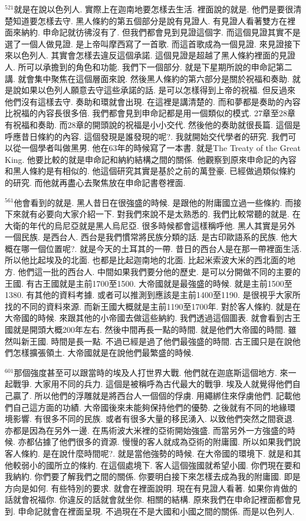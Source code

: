 \documentclass{book}
\begin{document}
$^{521}$就是在說以色列人.
實際上在迦南地要怎樣去生活.
裡面說的就是.
他們是要很清楚知道要怎樣去守.
黑人條約的第五個部分是說有見證人.
有見證人看著雙方在裡面來納約.
申命記就彷彿沒有了.
但我們都會見到見證這個字.
而這個見證其實不是選了一個人做見證.
是上帝叫摩西寫了一首歌.
而這首歌成為一個見證.
來見證接下來以色列人.
其實會怎樣去違反這個承諾.
這個見證是超越了黑人條約裡面的見證人.
所可以承擔到的角色和功能.
我們下一個部分.
就是下星期所說的申命記第二講.
就會集中聚焦在這個層面來說.
然後黑人條約的第六部分是關於祝福和奏助.
就是說如果以色列人願意去守這些承諾的話.
是可以怎樣得到上帝的祝福.
但反過來他們沒有這樣去守.
奏助和環就會出現.
在這裡是講清楚的.
而和夢都是奏助的內容比祝福的內容長很多倍.
我們都會見到申命記都是用一個類似的模式.
27章至28章有祝福和奏助.
而28章的開頭說的祝福是小小交代.
然後他的奏助就很長篇.
這個是呼應昔日條約的內容.
這個發現是誰發現的呢?.
我就開始交代學者的研究.
我們可以從一個學者叫做黑男.
他在63年的時候寫了一本書.
就是The Treaty of the Great King.
他要比較的就是申命記和納約結構之間的關係.
他觀察到原來申命記的內容和黑人條約是有相似的.
他這個研究其實是基於之前的萬登豪.
已經做過類似條約的研究.
而他就再盡心去聚焦放在申命記書卷裡面.

$^{561}$他會看到的就是.
黑人昔日在很強盛的時候.
是跟他的附庸國立過一些條約.
而接下來就有必要向大家介紹一下.
對我們來說不是太熟悉的.
我們比較常聽的就是.
在大衛的年代的烏尼亞就是黑人烏尼亞.
很多時候都會這樣稱呼他.
黑人其實是另外一個民族.
是西台人.
西台是我們慣常將民族分類的話.
是古印歐語系的民族.
他大概在哪一個位置呢?.
就是今天的土耳其的一帶.
昔日的西台人是在那一帶裡面生活.
所以他比起埃及的北面.
也都是比起迦南地的北面.
比起米索波大米的西北面的地方.
他們這一批的西台人.
中間如果我們要分他的歷史.
是可以分開做不同的主要的王國.
有古王國就是主前1700至1500.
大帝國就是最強盛的時候.
就是主前1500至1380.
有其他的資料考據.
或者可以推測到應該是主前1400至1190.
是很視乎大家所找的不同的資料來源.
而新王國大概就是主前1190至1700年.
對於客人條約.
就是在大帝國的時候.
來跟其他的小帝國去做這些納約.
我們透過這個圖表.
就會看到古王國就是開頭大概200年左右.
然後中間再長一點的時間.
就是他們大帝國的時間.
雖然叫新王國.
時間是長一點.
不過已經是過了他們最強盛的時間.
古王國只是在說他們怎樣擴張領土.
大帝國就是在說他們最繁盛的時候.

$^{601}$那個強度甚至可以跟當時的埃及人打世界大戰.
他們就在迦底斯這個地方.
來一起戰爭.
大家用不同的兵力.
這個是被稱呼為古代最大的戰爭.
埃及人就覺得他們自己贏了.
所以他們的浮雕就是將西台人一個個的俘虜.
用繩綁住來俘虜他們.
記載他們自己這方面的功績.
大帝國後來未能夠保持他們的優勢.
之後就有不同的地緣環境影響.
有很多不同的民族.
或者有很多大量的移民湧入.
以致他們突然之間衰退.
亦都是因為在另外一邊.
在馬術波大米裡的亞術開始強盛.
而當另外一方強盛的時候.
亦都佔據了他們很多的資源.
慢慢的客人就成為亞術的附庸國.
所以如果我們說客人條約.
是在說什麼時間呢?.
就是當他強勢的時候.
在大帝國的環境下.
就是和其他較弱小的國所立的條約.
在這個處境下.
客人這個強國就希望小國.
你們現在要和我納約.
你們要了解我們之間的關係.
你要明白接下來怎樣去成為我的附庸國.
即是方向是如何.
有些特別的要求.
就會在裡面說明.
現在有見證人看著.
如果你肯做的話就會祝福你.
你違反的話就會就坐你.
相關的結構.
原來我們在申命記裡面都會見到.
申命記就會在裡面呈現.
不過現在不是大國和小國之間的關係.
而是以色列人.
\end{document}
